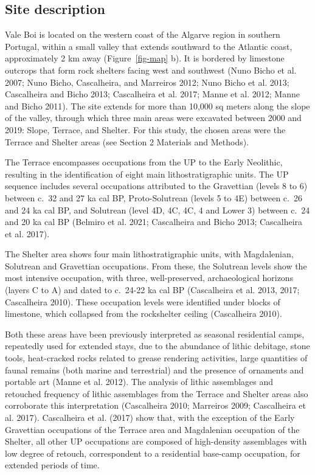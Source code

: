 \documentclass[
  a4paper,
  DIV=11,
  numbers=noendperiod]{scrreprt}
\begin{document}
\subsection{Site description}\label{site-description}

Vale Boi is located on the western coast of the Algarve region in
southern Portugal, within a small valley that extends southward to the
Atlantic coast, approximately 2 km away (Figure~\ref{fig-map} b). It is
bordered by limestone outcrops that form rock shelters facing west and
southwest (Nuno Bicho et al. 2007; Nuno Bicho, Cascalheira, and
Marreiros 2012; Nuno Bicho et al. 2013; Cascalheira and Bicho 2013;
Cascalheira et al. 2017; Manne et al. 2012; Manne and Bicho 2011). The
site extends for more than 10,000 sq meters along the slope of the
valley, through which three main areas were excavated between 2000 and
2019: Slope, Terrace, and Shelter. For this study, the chosen areas were
the Terrace and Shelter areas (see Section 2 Materials and Methods).

The Terrace encompasses occupations from the UP to the Early Neolithic,
resulting in the identification of eight main lithostratigraphic units.
The UP sequence includes several occupations attributed to the
Gravettian (levels 8 to 6) between c.~32 and 27 ka cal BP,
Proto-Solutrean (levels 5 to 4E) between c.~26 and 24 ka cal BP, and
Solutrean (level 4D, 4C, 4C, 4 and Lower 3) between c.~24 and 20 ka cal
BP (Belmiro et al. 2021; Cascalheira and Bicho 2013; Cascalheira et al.
2017).

The Shelter area shows four main lithostratigraphic units, with
Magdalenian, Solutrean and Gravettian occupations. From these, the
Solutrean levels show the most intensive occupation, with three,
well-preserved, archaeological horizons (layers C to A) and dated to
c.~24-22 ka cal BP (Cascalheira et al. 2013, 2017; Cascalheira 2010).
These occupation levels were identified under blocks of limestone, which
collapsed from the rockshelter ceiling (Cascalheira 2010).

Both these areas have been previously interpreted as seasonal
residential camps, repeatedly used for extended stays, due to the
abundance of lithic debitage, stone tools, heat-cracked rocks related to
grease rendering activities, large quantities of faunal remains (both
marine and terrestrial) and the presence of ornaments and portable art
(Manne et al. 2012). The analysis of lithic assemblages and retouched
frequency of lithic assemblages from the Terrace and Shelter areas also
corroborate this interpretation (Cascalheira 2010; Marreiros 2009;
Cascalheira et al. 2017). Cascalheira et al. (2017) show that, with the
exception of the Early Gravettian occupations of the Terrace area and
Magdalenian occupation of the Shelter, all other UP occupations are
composed of high-density assemblages with low degree of retouch,
correspondent to a residential base-camp occupation, for extended
periods of time.
\end{document}
